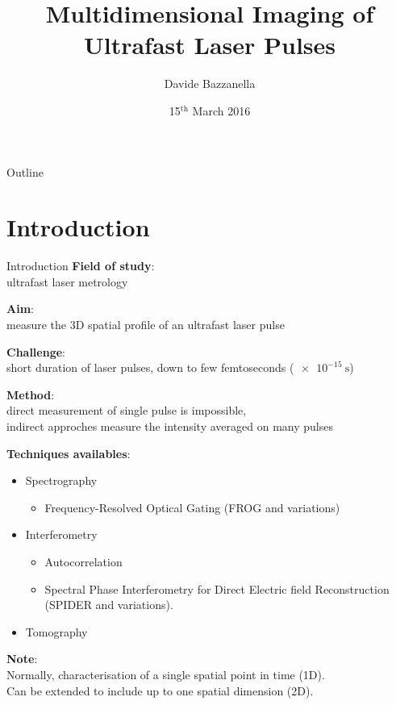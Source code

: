 \documentclass[11pt]{beamer}
\author{Davide Bazzanella}
\title{Multidimensional Imaging of Ultrafast Laser Pulses}
\institute{Imperial College London}
\date{15$^{\mathrm{th}}$ March 2016}
\begin{document}
\begin{frame}
\titlepage
\end{frame}

\begin{frame}{Outline}
\tableofcontents
\end{frame}

\section{Introduction}
\begin{frame}{Introduction}
\textbf{Field of study}:\\
	ultrafast laser metrology
	
\vspace{15pt}
\textbf{Aim}:\\
	measure the 3D spatial profile of an ultrafast laser pulse

\vspace{15pt}
\textbf{Challenge}:\\
	short duration of laser pulses, down to few femtoseconds ($\SI{e-15}{\s}$)
	
\vspace{15pt}
\textbf{Method}:\\
	direct measurement of single pulse is impossible,\\
	indirect approches measure the intensity averaged on many pulses
\end{frame}

\begin{frame}
\textbf{Techniques availables}:\\
\begin{itemize}
\item Spectrography
	\begin{itemize}
		\item Frequency-Resolved Optical Gating (FROG and variations)
	\end{itemize}
\item Interferometry
	\begin{itemize}
		\item Autocorrelation
		\item Spectral Phase Interferometry for Direct Electric field Reconstruction (SPIDER and variations).
	\end{itemize}
	\item Tomography
\end{itemize}

\vspace{15pt}
\textbf{Note}:\\
Normally, characterisation of a single spatial point in time (1D).\\
Can be extended to include up to one spatial dimension (2D).
\end{frame}
\end{document}
